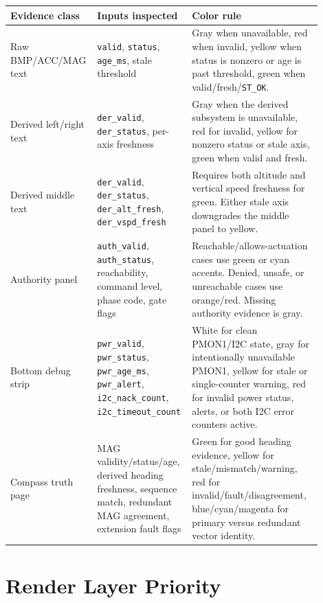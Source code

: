 \documentclass{article}
\newcommand{\sig}[1]{\begingroup\nolinkurl{#1}\endgroup}
\begin{document}
\begin{longtable}{p{0.22\linewidth} p{0.27\linewidth} p{0.41\linewidth}}
\toprule
\textbf{Evidence class} & \textbf{Inputs inspected} & \textbf{Color rule} \\
\midrule
\endhead
Raw BMP/ACC/MAG text &
\sig{valid}, \sig{status}, \sig{age_ms}, stale threshold &
Gray when unavailable, red when invalid, yellow when status is nonzero or age is
past threshold, green when valid/fresh/\sig{ST_OK}. \\

Derived left/right text &
\sig{der_valid}, \sig{der_status}, per-axis freshness &
Gray when the derived subsystem is unavailable, red for invalid, yellow for
nonzero status or stale axis, green when valid and fresh. \\

Derived middle text &
\sig{der_valid}, \sig{der_status}, \sig{der_alt_fresh},
\sig{der_vspd_fresh} &
Requires both altitude and vertical speed freshness for green.  Either stale
axis downgrades the middle panel to yellow. \\

Authority panel &
\sig{auth_valid}, \sig{auth_status}, reachability, command level, phase code,
gate flags &
Reachable/allows-actuation cases use green or cyan accents.  Denied, unsafe,
or unreachable cases use orange/red.  Missing authority evidence is gray. \\

Bottom debug strip &
\sig{pwr_valid}, \sig{pwr_status}, \sig{pwr_age_ms}, \sig{pwr_alert},
\sig{i2c_nack_count}, \sig{i2c_timeout_count} &
White for clean PMON1/I2C state, gray for intentionally unavailable PMON1,
yellow for stale or single-counter warning, red for invalid power status,
alerts, or both I2C error counters active. \\

Compass truth page &
MAG validity/status/age, derived heading freshness, sequence match, redundant
MAG agreement, extension fault flags &
Green for good heading evidence, yellow for stale/mismatch/warning, red for
invalid/fault/disagreement, blue/cyan/magenta for primary versus redundant
vector identity. \\
\bottomrule
\end{longtable}

\section{Render Layer Priority}
\end{document}
